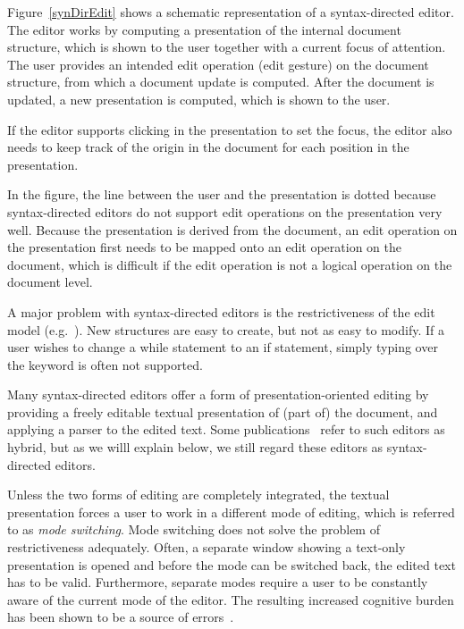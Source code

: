 Figure~\ref{synDirEdit} shows a schematic representation of a syntax-directed editor. The editor works by computing a presentation of the internal document structure, which is shown to the user together with a current focus of attention. The user provides an intended edit operation (edit gesture) on the document structure, from which a document update is computed. After the document is updated, a new presentation is computed, which is shown to the user.

If the editor supports clicking in the presentation to set the focus, the editor also needs to keep track of the origin in the document for each position in the presentation.

In the figure, the line between the user and the presentation is dotted because syntax-directed editors do not support edit operations on the presentation very well. Because the presentation is derived from the document, an edit operation on the presentation first needs to be mapped onto an edit operation on the document, which is difficult if the edit operation is not a logical operation on the document level.

A major problem with syntax-directed editors is the restrictiveness of the edit model (e.g.~\cite{vanter94practical,rubinNeal87design}). New structures are easy to create, but not as easy to modify. If a user wishes to change a while statement to an if statement, simply typing over the keyword is often not supported. 

Many syntax-directed editors offer a form of presentation-oriented editing by providing a freely editable textual presentation of (part of) the document, and applying a parser to the edited text. Some publications~\cite{teitelbaum81progSynth, minor90editing} refer to such editors as hybrid, but as we willl explain below, we still regard these editors as syntax-directed editors. 

Unless the two forms of editing are completely integrated, the textual presentation forces a user to work in a different mode of editing, which is referred to as {\em mode switching}. Mode switching does not solve the problem of restrictiveness adequately. Often, a separate window showing a text-only presentation is opened and before the mode can be switched back, the edited text has to be valid. Furthermore, separate modes require a user to be constantly aware of the current mode of the editor. The resulting increased cognitive burden has been shown to be a source of errors~\cite{sellen90modes}.

